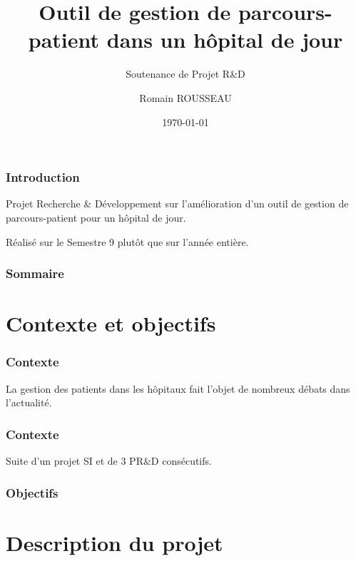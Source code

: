 \documentclass{beamer}
\title[Outil de gestion de parcours-patient]{Outil de gestion de parcours-patient dans un hôpital de jour}
\subtitle{Soutenance de Projet R\&D}
\author{Romain ROUSSEAU}
\date{\today}
\begin{document}
	
\begin{frame}[plain]
	\titlepage
\end{frame}


\begin{frame}[plain]
\frametitle{Introduction}

Projet Recherche \& Développement sur l'amélioration d'un outil de gestion de parcours-patient pour un hôpital de jour.

\bigbreak

Réalisé sur le Semestre 9 plutôt que sur l'année entière. 

\end{frame}


\begin{frame}

\frametitle{Sommaire}

\tableofcontents

\end{frame}


\section{Contexte et objectifs}


\begin{frame}
\frametitle{Contexte}

La gestion des patients dans les hôpitaux fait l'objet de nombreux débats dans l'actualité.

\end{frame}


\begin{frame}
\frametitle{Contexte}

Suite d'un projet SI et de 3 PR\&D consécutifs. 

\end{frame}

\begin{frame}
\frametitle{Objectifs}




\end{frame}



\section{Description du projet}
\end{document}
